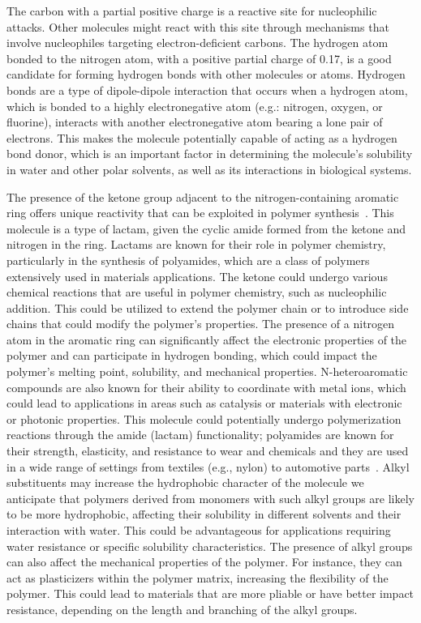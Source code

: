 \documentclass{article}
\begin{document}
%
The carbon with a partial positive charge is a reactive site for nucleophilic attacks. Other molecules might react with this site through mechanisms that involve nucleophiles targeting electron-deficient carbons. 
%
The hydrogen atom bonded to the nitrogen atom, with a positive partial charge of 0.17, is a good candidate for forming hydrogen bonds with other molecules or atoms. Hydrogen bonds are a type of dipole-dipole interaction that occurs when a hydrogen atom, which is bonded to a highly electronegative atom (e.g.: nitrogen, oxygen, or fluorine), interacts with another electronegative atom bearing a lone pair of electrons. This makes the molecule potentially capable of acting as a hydrogen bond donor, which is an important factor in determining the molecule's solubility in water and other polar solvents, as well as its interactions in biological systems.

The presence of the ketone group adjacent to the nitrogen-containing aromatic ring offers unique reactivity that can be exploited in polymer synthesis~\cite{McQuarrieSimonPhysicalChemistry,CareySundbergAdvancedOrganicChemistry,Varghese2022BeyondApplications,Varghese2022BeyondApplications}. This molecule is a type of lactam, given the cyclic amide formed from the ketone and nitrogen in the ring. Lactams are known for their role in polymer chemistry, particularly in the synthesis of polyamides, which are a class of polymers extensively used in materials applications. The ketone could undergo various chemical reactions that are useful in polymer chemistry, such as nucleophilic addition. This could be utilized to extend the polymer chain or to introduce side chains that could modify the polymer's properties. The presence of a nitrogen atom in the aromatic ring can significantly affect the electronic properties of the polymer and can participate in hydrogen bonding, which could impact the polymer's melting point, solubility, and mechanical properties. N-heteroaromatic compounds are also known for their ability to coordinate with metal ions, which could lead to applications in areas such as catalysis or materials with electronic or photonic properties. This molecule could potentially undergo polymerization reactions through the amide (lactam) functionality; polyamides are known for their strength, elasticity, and resistance to wear and chemicals and they are used in a wide range of settings from textiles (e.g., nylon) to automotive parts~\cite{Varghese2022BeyondApplications,Varghese2022BeyondApplications}.
%
Alkyl substituents may increase the hydrophobic character of the molecule we anticipate that polymers derived from monomers with such alkyl groups are likely to be more hydrophobic, affecting their solubility in different solvents and their interaction with water. This could be advantageous for applications requiring water resistance or specific solubility characteristics. The presence of alkyl groups can also affect the mechanical properties of the polymer. For instance, they can act as plasticizers within the polymer matrix, increasing the flexibility of the polymer. This could lead to materials that are more pliable or have better impact resistance, depending on the length and branching of the alkyl groups.
\end{document}
